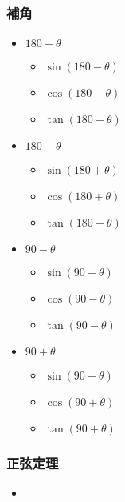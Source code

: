 \documentclass[10pt,dvipdfmx]{jsarticle}
\begin{document}
\subsubsection*{補角}
\begin{multicols}{4}
  \begin{itemize}
    \item $180-\theta$
          \begin{itemize}
            \item $\sin(180-\theta)$
            \item $\cos(180-\theta)$
            \item $\tan(180-\theta)$
          \end{itemize}
    \item $180+\theta$
          \begin{itemize}
            \item $\sin(180+\theta)$
            \item $\cos(180+\theta)$
            \item $\tan(180+\theta)$
          \end{itemize}
    \item $90-\theta$
          \begin{itemize}
            \item $\sin(90-\theta)$
            \item $\cos(90-\theta)$
            \item $\tan(90-\theta)$
          \end{itemize}
    \item $90+\theta$
          \begin{itemize}
            \item $\sin(90+\theta)$
            \item $\cos(90+\theta)$
            \item $\tan(90+\theta)$
          \end{itemize}
  \end{itemize}

\end{multicols}

\subsubsection*{正弦定理}
\begin{Large}
  \begin{itemize}
    \item
  \end{itemize}
\end{Large}
\end{document}
